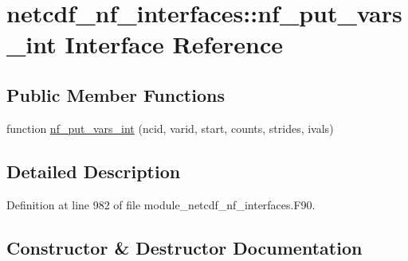 \hypertarget{interfacenetcdf__nf__interfaces_1_1nf__put__vars__int}{}\section{netcdf\+\_\+nf\+\_\+interfaces\+:\+:nf\+\_\+put\+\_\+vars\+\_\+int Interface Reference}
\label{interfacenetcdf__nf__interfaces_1_1nf__put__vars__int}
\subsection*{Public Member Functions}
\begin{DoxyCompactItemize}
\item 
function \hyperlink{interfacenetcdf__nf__interfaces_1_1nf__put__vars__int_ab45822a7bbee463ef165e838f6297571}{nf\+\_\+put\+\_\+vars\+\_\+int} (ncid, varid, start, counts, strides, ivals)
\end{DoxyCompactItemize}


\subsection{Detailed Description}


Definition at line 982 of file module\+\_\+netcdf\+\_\+nf\+\_\+interfaces.\+F90.



\subsection{Constructor \& Destructor Documentation}
\mbox{\label{interfacenetcdf__nf__interfaces_1_1nf__put__vars__int_ab45822a7bbee463ef165e838f6297571}} 
